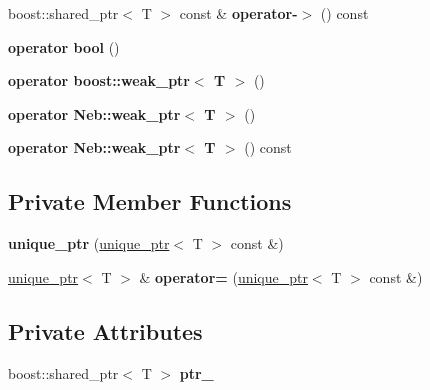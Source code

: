\begin{DoxyCompactItemize}
\item 
\hypertarget{classNeb_1_1unique__ptr_a4ca75f1d46551e5ae268e94bdc242cf2}{boost\-::shared\-\_\-ptr$<$ \-T $>$ const \& {\bfseries operator-\/$>$} () const }\label{classNeb_1_1unique__ptr_a4ca75f1d46551e5ae268e94bdc242cf2}

\item 
\hypertarget{classNeb_1_1unique__ptr_a299f10b1de2b1c37d3795753eecdf632}{{\bfseries operator bool} ()}\label{classNeb_1_1unique__ptr_a299f10b1de2b1c37d3795753eecdf632}

\item 
\hypertarget{classNeb_1_1unique__ptr_a1b178172f5769aff9f266ff845158a09}{{\bfseries operator boost\-::weak\-\_\-ptr$<$ T $>$} ()}\label{classNeb_1_1unique__ptr_a1b178172f5769aff9f266ff845158a09}

\item 
\hypertarget{classNeb_1_1unique__ptr_a6e2cd02db8e6e2a088a4c65733833bc0}{{\bfseries operator Neb\-::weak\-\_\-ptr$<$ T $>$} ()}\label{classNeb_1_1unique__ptr_a6e2cd02db8e6e2a088a4c65733833bc0}

\item 
\hypertarget{classNeb_1_1unique__ptr_ae9d9221fa91351daa793e30fc5105620}{{\bfseries operator Neb\-::weak\-\_\-ptr$<$ T $>$} () const }\label{classNeb_1_1unique__ptr_ae9d9221fa91351daa793e30fc5105620}

\end{DoxyCompactItemize}
\subsection*{\-Private \-Member \-Functions}
\begin{DoxyCompactItemize}
\item 
\hypertarget{classNeb_1_1unique__ptr_a79585a3cbcbe213f1a950ecf323691a5}{{\bfseries unique\-\_\-ptr} (\hyperlink{classNeb_1_1unique__ptr}{unique\-\_\-ptr}$<$ \-T $>$ const \&)}\label{classNeb_1_1unique__ptr_a79585a3cbcbe213f1a950ecf323691a5}

\item 
\hypertarget{classNeb_1_1unique__ptr_a8f3c0a31ca5f804867993a1203b31ba6}{\hyperlink{classNeb_1_1unique__ptr}{unique\-\_\-ptr}$<$ \-T $>$ \& {\bfseries operator=} (\hyperlink{classNeb_1_1unique__ptr}{unique\-\_\-ptr}$<$ \-T $>$ const \&)}\label{classNeb_1_1unique__ptr_a8f3c0a31ca5f804867993a1203b31ba6}

\end{DoxyCompactItemize}
\subsection*{\-Private \-Attributes}
\begin{DoxyCompactItemize}
\item 
\hypertarget{classNeb_1_1unique__ptr_aea69c28abf555c29636c736c142c9b2e}{boost\-::shared\-\_\-ptr$<$ \-T $>$ {\bfseries ptr\-\_\-}}\label{classNeb_1_1unique__ptr_aea69c28abf555c29636c736c142c9b2e}

\end{DoxyCompactItemize}
